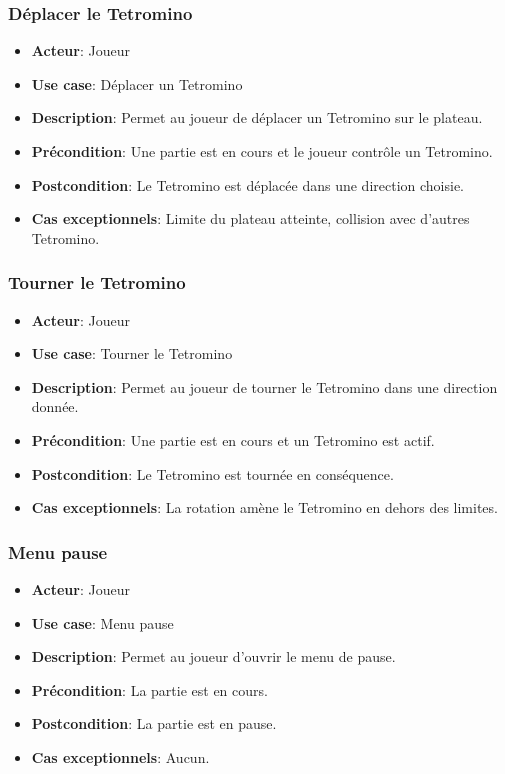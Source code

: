 \documentclass{article}
\begin{document}
\subsubsection*{Déplacer le Tetromino}
\begin{itemize}
    \item \textbf{Acteur}: Joueur
    \item \textbf{Use case}: Déplacer un Tetromino
    \item \textbf{Description}: Permet au joueur de déplacer un Tetromino sur le plateau.
    \item \textbf{Précondition}: Une partie est en cours et le joueur contrôle un Tetromino.
    \item \textbf{Postcondition}: Le Tetromino est déplacée dans une direction choisie.
    \item \textbf{Cas exceptionnels}: Limite du plateau atteinte, collision avec d'autres Tetromino.
\end{itemize}

\subsubsection*{Tourner le Tetromino}
\begin{itemize}
    \item \textbf{Acteur}: Joueur
    \item \textbf{Use case}: Tourner le Tetromino
    \item \textbf{Description}: Permet au joueur de tourner le Tetromino dans une direction donnée.
    \item \textbf{Précondition}: Une partie est en cours et un Tetromino est actif.
    \item \textbf{Postcondition}: Le Tetromino est tournée en conséquence.
    \item \textbf{Cas exceptionnels}: La rotation amène le Tetromino en dehors des limites.
\end{itemize}

\subsubsection*{Menu pause}
\begin{itemize}
    \item \textbf{Acteur}: Joueur
    \item \textbf{Use case}: Menu pause
    \item \textbf{Description}: Permet au joueur d'ouvrir le menu de pause.
    \item \textbf{Précondition}: La partie est en cours.
    \item \textbf{Postcondition}: La partie est en pause.
    \item \textbf{Cas exceptionnels}: Aucun.
\end{itemize}
\end{document}
